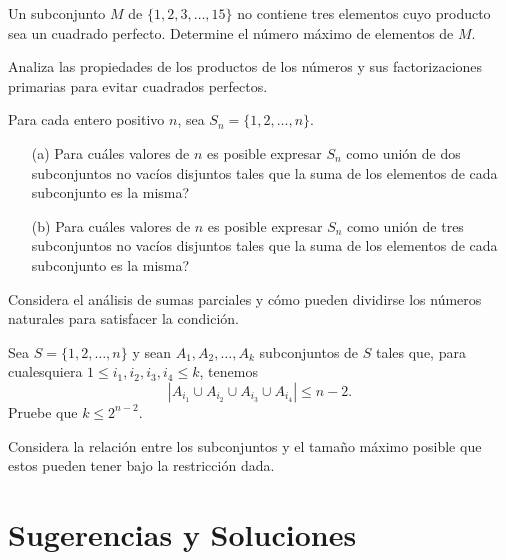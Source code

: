 \documentclass[11pt]{scrartcl}
\begin{document}
\begin{problem}
Un subconjunto $M$ de $\{1, 2, 3, \dots, 15\}$ no contiene tres elementos cuyo producto sea un cuadrado perfecto. Determine el número máximo de elementos de $M$.
\begin{hint}
Analiza las propiedades de los productos de los números y sus factorizaciones primarias para evitar cuadrados perfectos.
\end{hint}
\end{problem}

\begin{problem}
Para cada entero positivo $n$, sea $S_n = \{1, 2, \dots, n\}$.
\begin{itemize}
    \item[(a)] Para cuáles valores de $n$ es posible expresar $S_n$ como unión de dos subconjuntos no vacíos disjuntos tales que la suma de los elementos de cada subconjunto es la misma?
    \item[(b)] Para cuáles valores de $n$ es posible expresar $S_n$ como unión de tres subconjuntos no vacíos disjuntos tales que la suma de los elementos de cada subconjunto es la misma?
\end{itemize}
\begin{hint}
Considera el análisis de sumas parciales y cómo pueden dividirse los números naturales para satisfacer la condición.
\end{hint}
\end{problem}

\begin{problem}[Irán 1999]
Sea $S = \{1, 2, \dots, n\}$ y sean $A_1, A_2, \dots, A_k$ subconjuntos de $S$ tales que, para cualesquiera $1 \leq i_1, i_2, i_3, i_4 \leq k$, tenemos
\[
|A_{i_1} \cup A_{i_2} \cup A_{i_3} \cup A_{i_4}| \leq n - 2.
\]
Pruebe que $k \leq 2^{n-2}$.
\begin{hint}
Considera la relación entre los subconjuntos y el tamaño máximo posible que estos pueden tener bajo la restricción dada.
\end{hint}
\end{problem}



\section{Sugerencias y Soluciones}
\begin{enumerate}

\end{enumerate}
\end{document}
